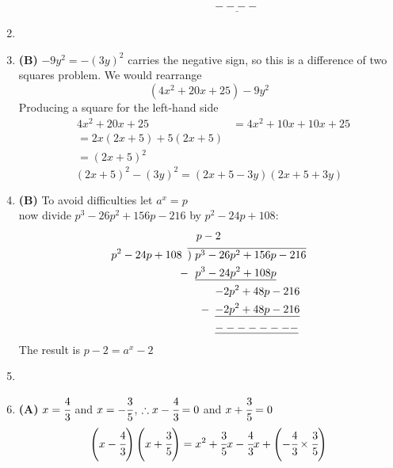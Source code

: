 \begin{multicols}{2}
\begin{enumerate}[label={\textbf{\arabic*.}}]
\begin{align*}
        & \hspace{51pt} \underline{----}
    \end{align*}
\item
\item \textbf{(B)} \( -9y^2 = -(3y)^2 \) carries the negative sign, so this is a difference of two squares problem. We would rearrange
        \[(4x^2 + 20x + 25) - 9y^2 \]
        Producing a square for the left-hand side
        \begin{align*}
        &4x^2 + 20x + 25 
        &= 4x^2 + 10x + 10x + 25 \\
        &= 2x(2x + 5) + 5(2x + 5) \\
        &= (2x + 5)^2
        \end{align*}
    \[(2x + 5)^2 - (3y)^2 = (2x + 5 - 3y)(2x + 5 + 3y) \] 
\item \textbf{(B)} To avoid difficulties let \( a^x = p \) \\
    now divide \( p^3 - 26p^2 + 156p - 216 \) by \( p^2 - 24p + 108 \):
    \begin{align*} 
        & \hspace{8pt} p - 2 \\
        p^2 - 24p + 108 \hspace{5pt} & \overline{)\hspace{3pt} p^3 - 26p^2 + 156p - 216} \\
       -\hspace{-1pt} & \hspace{7pt} \underline{p^3 - 24p^2 + 108p} \\
       & \hspace{25pt} {-2p^2 + 48p - 216} \\
      -\hspace{-20pt} & \hspace{25pt} \underline{-2p^2 + 48p - 216} \\
      & \hspace{25pt} \underline{--------}
    \end{align*}
    The result is \( p - 2 = a^x - 2 \)
\item
\item \textbf{(A)} \( x = \cfrac{4}{3} \) and \( x = -\cfrac{3}{5} \), \hspace{5pt} \( \therefore  x-\cfrac{4}{3} = 0 \) and \( x+\cfrac{3}{5} = 0 \) 
    \begin{align*}
    \left(x-\cfrac{4}{3}\right)\left(x+\cfrac{3}{5}\right) &= x^2 + \cfrac{3}{5}x - \cfrac{4}{3}x + \left(-\cfrac{4}{3} \times \cfrac{3}{5}\right) \\

\end{align*}
\end{enumerate}
\end{multicols}
